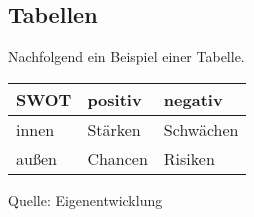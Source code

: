 \subsection{Tabellen}

Nachfolgend ein Beispiel einer Tabelle.
\begin{center}
		\begin{tabular}{l|ll}
		SWOT  & positiv & negativ   \\ \hline
		innen & Stärken & Schwächen \\
		außen & Chancen & Risiken  
		\end{tabular}
		Quelle: Eigenentwicklung
		\label{tab:swot-analyse}  
\end{center}
	





